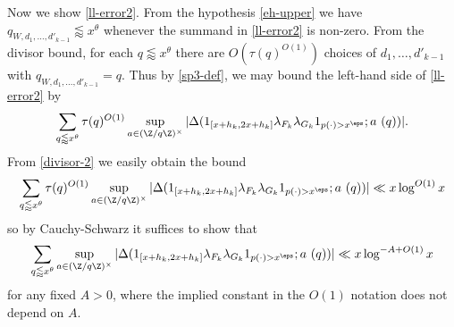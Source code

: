 Now we show \eqref{ll-error2}.  From the hypothesis \eqref{eh-upper} we have $q_{W,d_1,\dots,d'_{k-1}} \lessapprox x^\theta$ whenever the summand in \eqref{ll-error2} is non-zero.  From the divisor bound, for each $q \lessapprox x^\theta$ there are $O( \tau(q)^{O(1)})$ choices of $d_1,\dots,d'_{k-1}$ with $q_{W,d_1,\dots,d'_{k-1}} = q$.  Thus by \eqref{sp3-def}, we may bound the left-hand side of \eqref{ll-error2} by
$$
\sum_{q \lessapprox x^\theta} \tau(q)^{O(1)} \sup_{a \in (\Z/q\Z)^\times} |\Delta( 1_{[x+h_k,2x+h_k]} \lambda_{F_k} \lambda_{G_k} 1_{p(\cdot) > x^\eps};  a\ (q))|.
$$
From \eqref{divisor-2} we easily obtain the bound
$$
\sum_{q \lessapprox x^\theta} \tau(q)^{O(1)} \sup_{a \in (\Z/q\Z)^\times} |\Delta( 1_{[x+h_k,2x+h_k]} \lambda_{F_k} \lambda_{G_k} 1_{p(\cdot) > x^\eps};  a\ (q))| \ll x \log^{O(1)} x
$$
so by Cauchy-Schwarz it suffices to show that
\begin{equation}\label{local}
\sum_{q \lessapprox x^\theta} \sup_{a \in (\Z/q\Z)^\times} |\Delta( 1_{[x+h_k,2x+h_k]} \lambda_{F_k} \lambda_{G_k} 1_{p(\cdot) > x^\eps};  a\ (q))| \ll x \log^{-A+O(1)} x
\end{equation}
for any fixed $A>0$, where the implied constant in the $O(1)$ notation does not depend on $A$.

